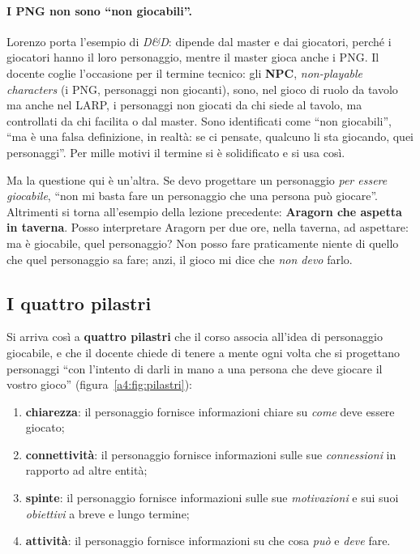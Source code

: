 \paragraph{I PNG non sono ``non giocabili''.} Lorenzo porta l'esempio di
\emph{D\&D}: dipende dal master e dai giocatori, perché i giocatori hanno il loro
personaggio, mentre il master gioca anche i PNG. Il docente coglie l'occasione per
il termine tecnico: gli \textbf{NPC}, \emph{non-playable characters} (i PNG,
personaggi non giocanti), sono, nel gioco di ruolo da tavolo ma anche nel LARP,
i personaggi non giocati da chi siede al tavolo, ma controllati da chi facilita o
dal master. Sono identificati come ``non giocabili'', ``ma è una falsa
definizione, in realtà: se ci pensate, qualcuno li sta giocando, quei
personaggi''. Per mille motivi il termine si è solidificato e si usa così.

Ma la questione qui è un'altra. Se devo progettare un personaggio \emph{per essere
giocabile}, ``non mi basta fare un personaggio che una persona può giocare''.
Altrimenti si torna all'esempio della lezione precedente: \textbf{Aragorn che
aspetta in taverna}. Posso interpretare Aragorn per due ore, nella taverna, ad
aspettare: ma è giocabile, quel personaggio? Non posso fare praticamente niente di
quello che quel personaggio sa fare; anzi, il gioco mi dice che \emph{non devo}
farlo.

\subsection{I quattro pilastri}

Si arriva così a \textbf{quattro pilastri} che il corso associa all'idea di
personaggio giocabile, e che il docente chiede di tenere a mente ogni volta che si
progettano personaggi ``con l'intento di darli in mano a una persona che deve
giocare il vostro gioco'' (figura~\ref{a4:fig:pilastri}):
\begin{enumerate}
  \item \textbf{chiarezza}: il personaggio fornisce informazioni chiare su
        \emph{come} deve essere giocato;
  \item \textbf{connettività}: il personaggio fornisce informazioni sulle sue
        \emph{connessioni} in rapporto ad altre entità;
  \item \textbf{spinte}: il personaggio fornisce informazioni sulle sue
        \emph{motivazioni} e sui suoi \emph{obiettivi} a breve e lungo termine;
  \item \textbf{attività}: il personaggio fornisce informazioni su che cosa
        \emph{può} e \emph{deve} fare.
\end{enumerate}

